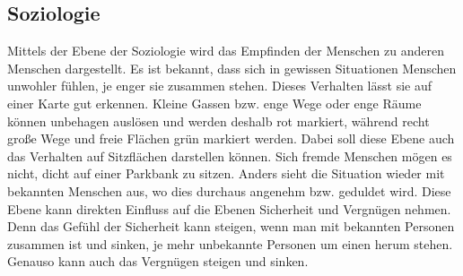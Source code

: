 \documentclass[10pt]{scrartcl}
\begin{document}
\subsection{Soziologie}
Mittels der Ebene der Soziologie wird das Empfinden der Menschen zu anderen Menschen dargestellt. Es ist bekannt, dass sich in gewissen Situationen Menschen unwohler fühlen, je enger sie zusammen stehen. Dieses Verhalten lässt sie auf einer Karte gut erkennen. Kleine Gassen bzw. enge Wege oder enge Räume können unbehagen auslösen und werden deshalb rot markiert, während recht große Wege und freie Flächen grün markiert werden.
\newline Dabei soll diese Ebene auch das Verhalten auf Sitzflächen darstellen können. Sich fremde Menschen mögen es nicht, dicht auf einer Parkbank zu sitzen. Anders sieht die Situation wieder mit bekannten Menschen aus, wo dies durchaus angenehm bzw. geduldet wird.
\newline Diese Ebene kann direkten Einfluss auf die Ebenen Sicherheit und Vergnügen nehmen. Denn das Gefühl der Sicherheit kann steigen, wenn man mit bekannten Personen zusammen ist und sinken, je mehr unbekannte Personen um einen herum stehen. Genauso kann auch das Vergnügen steigen und sinken.

\end{document}
